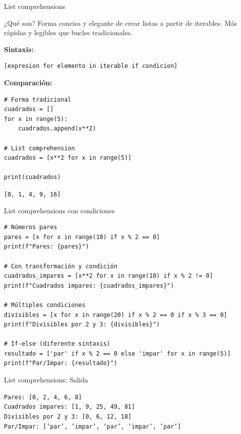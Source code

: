 \documentclass{beamer}
\begin{document}
\begin{frame}[fragile]{List comprehensions \faListUl}
\begin{conceptbox}{¿Qué son?}
Forma concisa y elegante de crear listas a partir de iterables. Más rápidas y legibles que bucles tradicionales.
\end{conceptbox}

\textbf{Sintaxis:}
\begin{lstlisting}
[expresion for elemento in iterable if condicion]
\end{lstlisting}

\vspace{0.2cm}
\textbf{Comparación:}
\begin{lstlisting}
# Forma tradicional
cuadrados = []
for x in range(5):
    cuadrados.append(x**2)

# List comprehension
cuadrados = [x**2 for x in range(5)]

print(cuadrados)
\end{lstlisting}

\vspace{-0.2cm}
\begin{tcolorbox}[colback=green!10,colframe=green,title={\small\faArrowCircleRight \ Salida},coltitle=fg0,left=3pt,right=3pt,top=2pt,bottom=2pt,boxsep=1pt]
\small\texttt{[0, 1, 4, 9, 16]}
\end{tcolorbox}
\end{frame}

\begin{frame}[fragile]{List comprehensions con condiciones \faFilter}
\begin{lstlisting}
# Números pares
pares = [x for x in range(10) if x % 2 == 0]
print(f"Pares: {pares}")

# Con transformación y condición
cuadrados_impares = [x**2 for x in range(10) if x % 2 != 0]
print(f"Cuadrados impares: {cuadrados_impares}")

# Múltiples condiciones
divisibles = [x for x in range(20) if x % 2 == 0 if x % 3 == 0]
print(f"Divisibles por 2 y 3: {divisibles}")

# If-else (diferente sintaxis)
resultado = ['par' if x % 2 == 0 else 'impar' for x in range(5)]
print(f"Par/Impar: {resultado}")
\end{lstlisting}
\end{frame}

\begin{frame}[fragile]{List comprehensions: Salida \faArrowCircleRight}
\begin{tcolorbox}[colback=green!10,colframe=green,title={\small\faArrowCircleRight \ Salida},coltitle=fg0,left=3pt,right=3pt,top=3pt,bottom=3pt,boxsep=2pt]
\small\texttt{Pares: [0, 2, 4, 6, 8]\\
Cuadrados impares: [1, 9, 25, 49, 81]\\
Divisibles por 2 y 3: [0, 6, 12, 18]\\
Par/Impar: ['par', 'impar', 'par', 'impar', 'par']}
\end{tcolorbox}
\end{frame}
\end{document}
